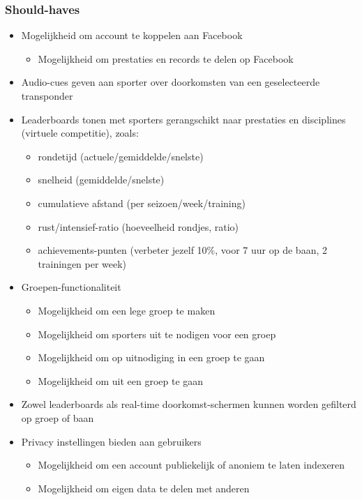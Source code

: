 \subsubsection{Should-haves}
\begin{itemize}
    \item Mogelijkheid om account te koppelen aan Facebook
    \begin{itemize}
        \item Mogelijkheid om prestaties en records te delen op Facebook
    \end{itemize}
    \item Audio-cues geven aan sporter over doorkomsten van een geselecteerde transponder
    \item Leaderboards tonen met sporters gerangschikt naar prestaties en disciplines (virtuele competitie), zoals:
    \begin{itemize}
        \item rondetijd (actuele/gemiddelde/snelste)
        \item snelheid (gemiddelde/snelste)
        \item cumulatieve afstand (per seizoen/week/training)
        \item rust/intensief-ratio (hoeveelheid rondjes, ratio)
        \item achievements-punten (verbeter jezelf 10\%, voor 7 uur op de baan, 2 trainingen per week)
    \end{itemize}
    
    \item Groepen-functionaliteit \begin{itemize}
        \item Mogelijkheid om een lege groep te maken
        \item Mogelijkheid om sporters uit te nodigen voor een groep
        \item Mogelijkheid om op uitnodiging in een groep te gaan
        \item Mogelijkheid om uit een groep te gaan
    \end{itemize}

    \item Zowel leaderboards als real-time doorkomst-schermen kunnen worden gefilterd op groep of baan
     
    \item Privacy instellingen bieden aan gebruikers
    \begin{itemize}
        \item Mogelijkheid om een account publiekelijk of anoniem te laten indexeren
        \item Mogelijkheid om eigen data te delen met anderen
    \end{itemize}

\end{itemize}

